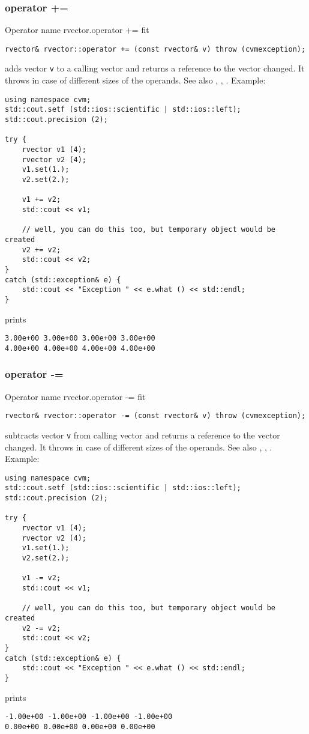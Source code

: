 \subsubsection{operator +=}
Operator%
\pdfdest name {rvector.operator +=} fit
\begin{verbatim}
rvector& rvector::operator += (const rvector& v) throw (cvmexception);
\end{verbatim}
adds vector \verb"v" to a calling vector 
and returns a reference to
the vector changed.
It throws  
in case of different sizes of the operands.
See also ,
,
.
Example:
\begin{Verbatim}
using namespace cvm;
std::cout.setf (std::ios::scientific | std::ios::left); 
std::cout.precision (2);

try {
    rvector v1 (4);
    rvector v2 (4);
    v1.set(1.);
    v2.set(2.);

    v1 += v2;
    std::cout << v1;

    // well, you can do this too, but temporary object would be created
    v2 += v2; 
    std::cout << v2;
}
catch (std::exception& e) {
    std::cout << "Exception " << e.what () << std::endl;
}
\end{Verbatim}
prints
\begin{Verbatim}
3.00e+00 3.00e+00 3.00e+00 3.00e+00
4.00e+00 4.00e+00 4.00e+00 4.00e+00
\end{Verbatim}
\newpage


\subsubsection{operator -=}
Operator%
\pdfdest name {rvector.operator -=} fit
\begin{verbatim}
rvector& rvector::operator -= (const rvector& v) throw (cvmexception);
\end{verbatim}
subtracts vector \verb"v" from calling vector 
and returns a reference to
the vector changed.
It throws  
in case of different sizes of the operands.
See also 
,
,
.
Example:
\begin{Verbatim}
using namespace cvm;
std::cout.setf (std::ios::scientific | std::ios::left); 
std::cout.precision (2);

try {
    rvector v1 (4);
    rvector v2 (4);
    v1.set(1.);
    v2.set(2.);

    v1 -= v2;
    std::cout << v1;

    // well, you can do this too, but temporary object would be created
    v2 -= v2; 
    std::cout << v2;
}
catch (std::exception& e) {
    std::cout << "Exception " << e.what () << std::endl;
}
\end{Verbatim}
prints
\begin{Verbatim}
-1.00e+00 -1.00e+00 -1.00e+00 -1.00e+00
0.00e+00 0.00e+00 0.00e+00 0.00e+00
\end{Verbatim}
\newpage


